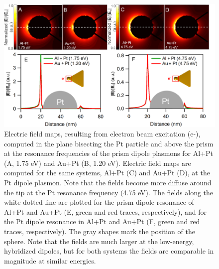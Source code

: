 \documentclass [11pt, proquest] {uwthesis}[2016/11/22]
\begin{document}
\begin{figure}
\begin{centering}
\includegraphics{prisms_field_calculations.png}
\caption{Electric field maps, resulting from electron beam excitation (e-), computed in the plane bisecting the Pt particle and above the prism at the resonance frequencies of the prism dipole plasmons for Al+Pt (A, 1.75 eV) and Au+Pt (B, 1.20 eV). Electric field maps are computed for the same systems, Al+Pt (C) and Au+Pt (D), at the Pt dipole plasmon. Note that the fields become more diffuse around the tip at the Pt resonance frequency (4.75 eV). The fields along the white dotted line are plotted for the prism dipole resonance of Al+Pt and Au+Pt (E, green and red traces, respectively), and for the Pt dipole resonance in Al+Pt and Au+Pt (F, green and red traces, respectively). The gray shapes mark the position of the sphere. Note that the fields are much larger at the low-energy, hybridized dipoles, but for both systems the fields are comparable in magnitude at similar energies.}
\label{field_top}
\end{centering}
\end{figure}
\end{document}
